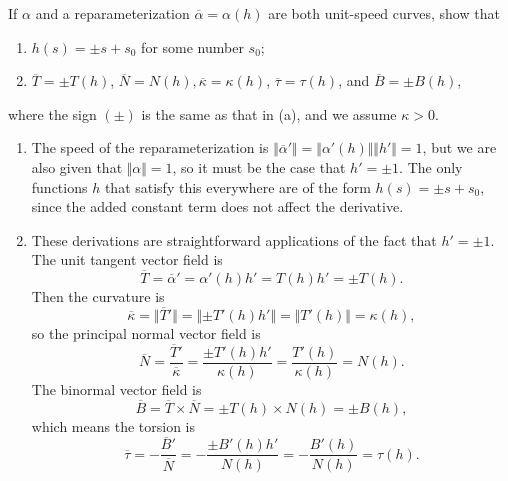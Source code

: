 \documentclass[10pt]{report}
\begin{document}
\begin{exer}[2.3: 7]
	If $\alpha$ and a reparameterization $\overline{\alpha} =\alpha(h)$ are both unit-speed curves, show that
	\begin{enumerate}
		\item $h(s)=\pm s + s_0$ for some number $s_0$;
		\item $\overline{T} = \pm T(h)$, $\overline{N}=N(h), \overline{\kappa} =\kappa(h)$, $\overline{\tau} =\tau(h)$, and $\overline{B}=\pm B(h)$,
	\end{enumerate}
	where the sign $(\pm)$ is the same as that in (a), and we assume $\kappa>0$.
\end{exer}
\begin{enumerate}
	\item The speed of the reparameterization is $\Vert{\overline{\alpha}'}\Vert= \Vert{\alpha'(h)}\Vert \Vert{h'}\Vert = 1$, but we are also given that $\Vert\alpha\Vert=1$, so it must be the case that $h'=\pm 1$. The only functions $h$ that satisfy this everywhere are of the form $h(s) = \pm s + s_0$, since the added constant term does not affect the derivative.

	\item These derivations are straightforward applications of the fact that $h' = \pm 1$. The unit tangent vector field is
		\[
			\overline{T}=\overline{\alpha}' = \alpha'(h)h' = T(h)h' = \pm T(h).
		\] Then the curvature is
		\[
			\overline{\kappa} = \Vert{\overline{T}'}\Vert=\Vert{\pm T'(h)h'}\Vert=\Vert{T'(h)}\Vert=\kappa(h),
		\] so the principal normal vector field is
		\[
			\overline{N}=\frac{\overline{T}'}{\overline{\kappa}} = \frac{\pm T'(h)h'}{\kappa(h)} = \frac{T'(h)}{\kappa(h)} = N(h).
		\] The binormal vector field is
		\[
			\overline{B}= \overline{T}\times \overline{N} = \pm T(h) \times N(h) = \pm B(h),
		\] which means the torsion is
		\[
			\overline{\tau} = -\frac{\overline{B}'}{\overline{N}} =-\frac{\pm B'(h) h'}{N(h)} = -\frac{B'(h)}{N(h)} = \tau(h).
		\] 
\end{enumerate}
\end{document}
